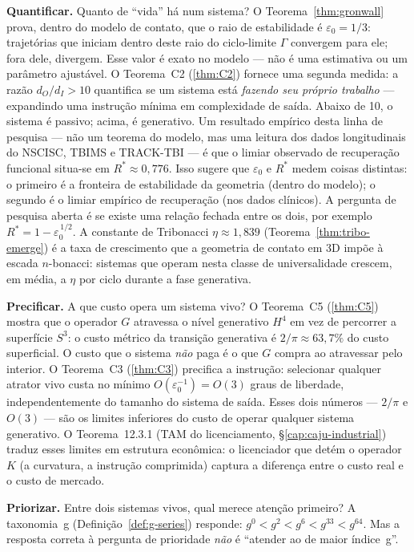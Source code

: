 \documentclass[12pt,a4paper,twoside]{book}
\theoremstyle{plain}
\theoremstyle{definition}
\theoremstyle{definition}
\begin{document}
\medskip
\noindent\textbf{Quantificar.}
Quanto de ``vida'' há num sistema? O Teorema~\ref{thm:gronwall} prova,
dentro do modelo de contato, que o raio de estabilidade é
$\varepsilon_0 = 1/3$: trajetórias que iniciam dentro deste raio do
ciclo-limite $\Gamma$ convergem para ele; fora dele, divergem. Esse valor
é exato no modelo --- não é uma estimativa ou um parâmetro ajustável.
O Teorema~C2 (\ref{thm:C2}) fornece uma segunda medida: a razão
$d_O / d_I > 10$ quantifica se um sistema está \emph{fazendo seu próprio
trabalho} --- expandindo uma instrução mínima em complexidade de saída.
Abaixo de 10, o sistema é passivo; acima, é generativo.
Um resultado empírico desta linha de pesquisa --- não um teorema do
modelo, mas uma leitura dos dados longitudinais do NSCISC, TBIMS e
TRACK-TBI \cite{GrossiSCITBI} --- é que o limiar observado de
recuperação funcional situa-se em $R^{*} \approx 0{,}776$.
Isso sugere que $\varepsilon_0$ e $R^{*}$ medem coisas distintas: o
primeiro é a fronteira de estabilidade da geometria (dentro do modelo);
o segundo é o limiar empírico de recuperação (nos dados clínicos).
A pergunta de pesquisa aberta é se existe uma relação fechada entre
os dois, por exemplo $R^{*} = 1 - \varepsilon_0^{\,1/2}$.
A constante de Tribonacci $\eta \approx 1{,}839$
(Teorema~\ref{thm:tribo-emerge}) é a taxa de crescimento que a geometria
de contato em 3D impõe à escada $n$-bonacci: sistemas que operam nesta
classe de universalidade crescem, em média, a $\eta$ por ciclo durante
a fase generativa.

\medskip
\noindent\textbf{Precificar.}
A que custo opera um sistema vivo? O Teorema~C5 (\ref{thm:C5}) mostra
que o operador $G$ atravessa o nível generativo $H^4$ em vez de percorrer
a superfície $S^3$: o custo métrico da transição generativa é
$2/\pi \approx 63{,}7\%$ do custo superficial. O custo que o sistema
\emph{não} paga é o que $G$ compra ao atravessar pelo interior.
O Teorema~C3 (\ref{thm:C3}) precifica a instrução: selecionar qualquer
atrator vivo custa no mínimo $O(\varepsilon_0^{-1}) = O(3)$ graus de
liberdade, independentemente do tamanho do sistema de saída. Esses dois
números --- $2/\pi$ e $O(3)$ --- são os limites inferiores do custo de
operar qualquer sistema generativo. O Teorema~12.3.1 (TAM do
licenciamento, \S\ref{cap:caju-industrial}) traduz esses limites em estrutura
econômica: o licenciador que detém o operador $K$ (a curvatura, a
instrução comprimida) captura a diferença entre o custo real e o custo
de mercado.

\medskip
\noindent\textbf{Priorizar.}
Entre dois sistemas vivos, qual merece atenção primeiro? A taxonomia~g
(Definição~\ref{def:g-series}) responde: $g^0 < g^2 < g^6 < g^{33} <
g^{64}$. Mas a resposta correta à pergunta de prioridade \emph{não} é
``atender ao de maior índice~g''.
\end{document}

